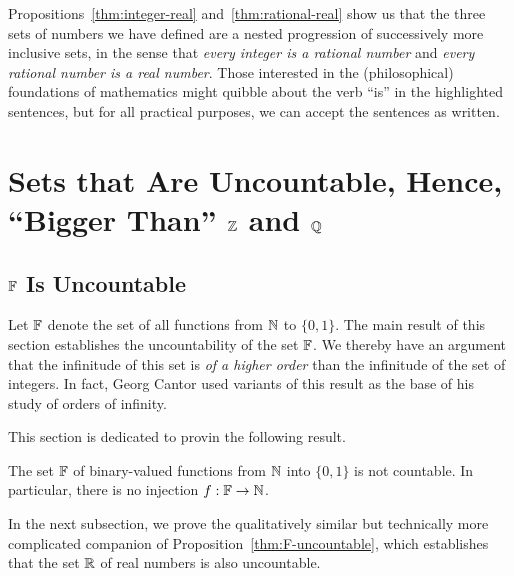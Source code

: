 \bigskip

Propositions~\ref{thm:integer-real} and~\ref{thm:rational-real} show
us that the three sets of numbers we have defined are a nested
progression of successively more inclusive sets, in the sense that
{\em every integer is a rational number} and {\em every rational
  number is a real number}.  Those interested in the (philosophical)
foundations of mathematics might quibble about the verb ``is'' in the
highlighted sentences, but for all practical purposes, we can accept
the sentences as written.

\section{Sets that Are Uncountable, Hence, ``Bigger Than'' $\mathbb{Z}$ and $\mathbb{Q}$}
\label{sec:Q-Z-F-cardinality}
\label{sec:FNS-uncountable}

\subsection{$\mathbb{F}$ Is Uncountable}
\label{sec:F-uncountable}

Let $\mathbb{F}$ denote the set of all functions from $\mathbb{N}$ to $\{0,1\}$.  The
main result of this section establishes the uncountability of the set
$\mathbb{F}$.  We thereby have an argument that the infinitude of this set is
{\em of a higher order} than the infinitude of the set of integers.
In fact, Georg Cantor used variants of this result as the base of his
study of orders of infinity.

This section is dedicated to provin the following result.

\begin{prop}
\label{thm:F-uncountable}
The set $\mathbb{F}$ of binary-valued functions from $\mathbb{N}$ into $\{0,1\}$ is
not countable.  In particular, there is no injection $f: \mathbb{F}
\rightarrow \mathbb{N}$.
\end{prop}

In the next subsection, we prove the qualitatively similar but
technically more complicated companion of
Proposition~\ref{thm:F-uncountable}, which establishes that the set
$\mathbb{R}$ of real numbers is also uncountable.

